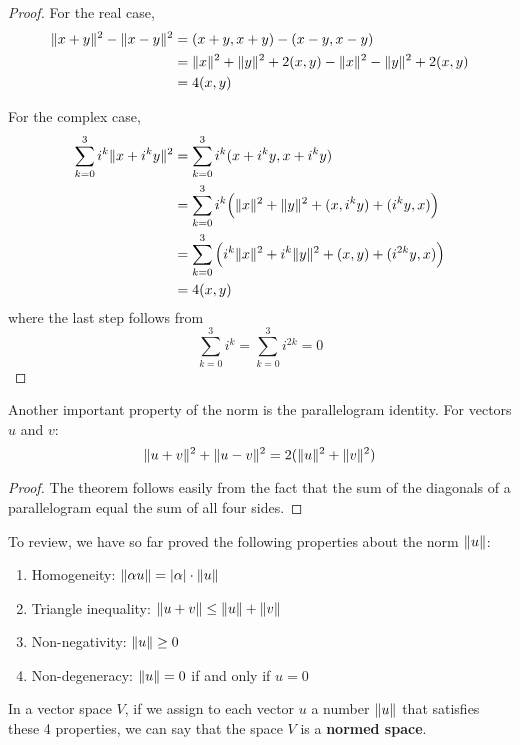 \begin{proof}
For the real case, 
$$ 
\begin{aligned}
\lVert x + y\rVert^{2} - \lVert x - y\rVert^{2} &= (x + y, x + y) - (x - y, x - y) \\
&= \lVert x\rVert^{2} + \lVert y\rVert^{2} + 2 (x, y) - \lVert x\rVert^{2} - \lVert y\rVert^{2} + 2 (x, y) \\ 
&= 4 (x, y)
\end{aligned}
$$

For the complex case, 
$$
\begin{aligned}
\sum_{k = 0}^{3} i^{k} \lVert x + i^{k}y\rVert^{2} &= \sum_{k = 0}^{3} i^{k} (x + i^{k}y, x + i^{k}y) \\
&= \sum_{k = 0}^{3} i^{k} \Big( \lVert x\rVert^{2} + \lVert y\rVert^{2} + (x, i^{k}y) + (i^{k}y, x) \Big) \\
&= \sum_{k = 0}^{3} \Big( i^{k} \lVert x\rVert^{2} + i^{k} \lVert y\rVert^{2} + (x, y) + (i^{2k} y, x) \Big) \\
&= 4 (x, y)
\end{aligned}
$$
where the last step follows from 
$$ \sum_{k = 0}^{3} i^{k} = \sum_{k = 0}^{3} i^{2k} = 0$$
\end{proof}

\begin{theorem}
Another important property of the norm is the parallelogram identity. For vectors $u$ and $v$: 
$$\lVert u + v\rVert^{2} + \lVert u - v\rVert^{2} = 2( \lVert u\rVert^{2} + \lVert v\rVert^{2} )$$
\end{theorem}

\begin{proof}
The theorem follows easily from the fact that the sum of the diagonals of a parallelogram equal the sum of all four sides. 
\end{proof}

To review, we have so far proved the following properties about the norm $\lVert u\rVert$: 
\begin{enumerate}
	\item Homogeneity: $\lVert\alpha u\rVert = \lvert\alpha\rvert \cdot \lVert u\rVert$ 
	\item Triangle inequality: $\lVert u + v\rVert \leq \lVert u\rVert + \lVert v\rVert$
	\item Non-negativity: $\lVert u\rVert \geq 0$ 
	\item Non-degeneracy: $\lVert u\rVert = 0$ if and only if $u = 0$
\end{enumerate}

In a vector space $V$, if we assign to each vector $u$ a number $\lVert u\rVert$ that satisfies these 4 properties, we can say that the space $V$ is a \textbf{normed space}. 

